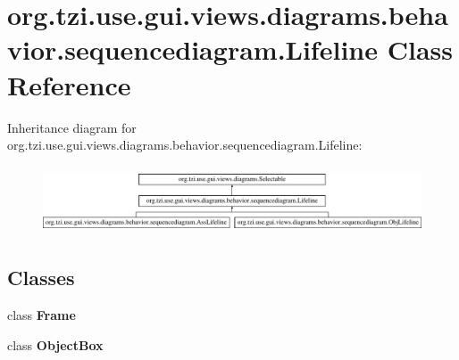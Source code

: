 \hypertarget{classorg_1_1tzi_1_1use_1_1gui_1_1views_1_1diagrams_1_1behavior_1_1sequencediagram_1_1_lifeline}{\section{org.\-tzi.\-use.\-gui.\-views.\-diagrams.\-behavior.\-sequencediagram.\-Lifeline Class Reference}
\label{classorg_1_1tzi_1_1use_1_1gui_1_1views_1_1diagrams_1_1behavior_1_1sequencediagram_1_1_lifeline}
}
Inheritance diagram for org.\-tzi.\-use.\-gui.\-views.\-diagrams.\-behavior.\-sequencediagram.\-Lifeline\-:\begin{figure}[H]
\begin{center}
\leavevmode
\includegraphics[height=2.028986cm]{classorg_1_1tzi_1_1use_1_1gui_1_1views_1_1diagrams_1_1behavior_1_1sequencediagram_1_1_lifeline}
\end{center}
\end{figure}
\subsection*{Classes}
\begin{DoxyCompactItemize}
\item 
class {\bfseries Frame}
\item 
class {\bfseries Object\-Box}
\end{DoxyCompactItemize}
